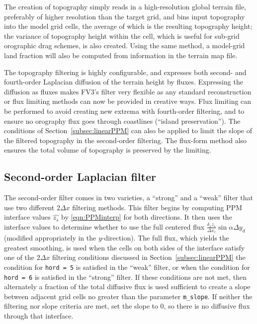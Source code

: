 \documentclass[10pt,letterpaper,margin=1in]{memoir}
\begin{document}
The creation of topography simply reads in a high-resolution global terrain file, preferably of higher resolution than the target grid, and bins input topography into the model grid cells, the average of which is the resulting topography height; the variance of topography height within the cell, which is useful for sub-grid orographic drag schemes, is also created. Using the same method, a model-grid land fraction will also be computed from information in the terrain map file.

The topography filtering is highly configurable, and expresses both second- and fourth-order Laplacian diffusion of the terrain height by fluxes. Expressing the diffusion as fluxes makes FV3's filter very flexible as any standard reconstruction or flux limiting methods can now be provided in creative ways. Flux limiting can be performed to avoid creating new extrema with fourth-order filtering, and to ensure no orography flux goes through coastlines (``island preservation''). The conditions of Section~\ref{subsec:linearPPM} can also be applied to limit the slope of the filtered topography in the second-order filtering. The flux-form method also ensures the total volume of topography is preserved by the limiting.

\subsection{Second-order Laplacian filter}

The second-order filter comes in two varieties, a ``strong'' and a ``weak'' filter that use two different $2\Delta x$ filtering methods. This filter
begins by computing PPM interface values $\widehat{z_s}$ by \eqref{eqn:PPMinterp} for both directions. It then uses the interface values to determine whether to use the full centered flux $\frac{\delta_x z_s}{\Delta x_c}\sin \alpha \Delta y_d$ (modified appropriately in the $y$-direction). The full flux, which yields the greatest smoothing, is used when the cells on both sides of the interface satisfy one of the $2\Delta x$ filtering conditions discussed in Section~\ref{subsec:linearPPM} the condition for \texttt{hord = 5} is satisfied in the ``weak'' filter, or when the condition for \texttt{hord = 6} is satisfied in the ``strong'' filter. If these conditions are not met, then alternately a fraction of the total diffusive flux is used sufficient to create a slope between adjacent grid cells no greater than the parameter \texttt{{m_slope}}. If neither the filtering nor slope criteria are met, set the slope to 0, so there is no diffusive flux through that interface.
\end{document}

